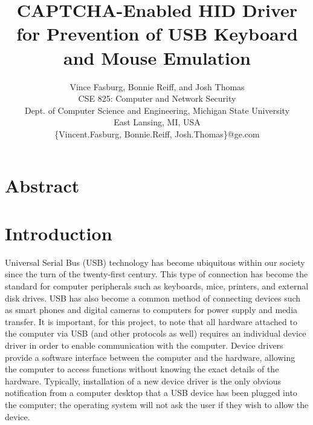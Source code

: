 \documentclass[pagenumbers]{ieee}
\begin{document}
\title{CAPTCHA-Enabled HID Driver \\ for Prevention of USB Keyboard and Mouse Emulation\\}

\author{Vince Fasburg, Bonnie Reiff, and Josh Thomas\\
CSE 825: Computer and Network Security\\
Dept. of Computer Science and Engineering, Michigan State University\\
East Lansing, MI, USA\\
\{Vincent.Fasburg, Bonnie.Reiff, Josh.Thomas\}@ge.com\\
}

\maketitle
\thispagestyle{empty}


\section{Abstract}
\label{section:abstract}


\section{Introduction}
\label{section:intro}

Universal Serial Bus (USB) technology has become ubiquitous within our society since the turn of the twenty-first century. This type of connection has become the standard for computer peripherals such as keyboards, mice, printers, and external disk drives. USB has also become a common method of connecting devices such as smart phones and digital cameras to computers for power supply and media transfer. It is important, for this project, to note that all hardware attached to the computer via USB (and other protocols as well) requires an individual device driver in order to enable communication with the computer. Device drivers provide a software interface between the computer and the hardware, allowing the computer to access functions without knowing the exact details of the hardware. Typically, installation of a new device driver is the only obvious notification from a computer desktop that a USB device has been plugged into the computer; the operating system will not ask the user if they wish to allow the device.
\end{document}
